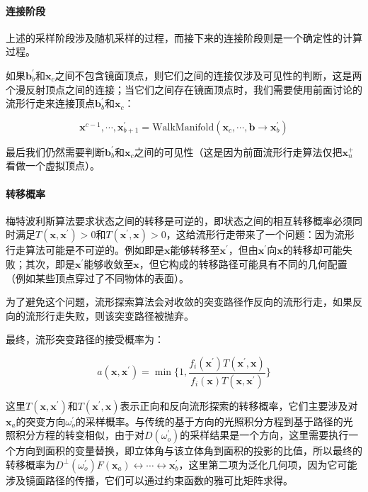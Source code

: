 \paragraph{连接阶段}
上述的采样阶段涉及随机采样的过程，而接下来的连接阶段则是一个确定性的计算过程。

如果$\mathbf{b}^{'}_b$和$\mathbf{x}_c$之间不包含镜面顶点，则它们之间的连接仅涉及可见性的判断，这是两个漫反射顶点之间的连接；当它们之间存在镜面顶点时，我们需要使用前面讨论的流形行走来连接顶点$\mathbf{b}^{'}_b$和$\mathbf{x}_c$：

\begin{equation}
	\mathbf{x}^{c-1},\cdots,\mathbf{x}^{'}_{b+1}=\text{WalkManifold}(\mathbf{x}_c,\cdots,\mathbf{b}\to\mathbf{x}^{'}_b)
\end{equation}

\noindent 最后我们仍然需要判断$\mathbf{b}^{'}_b$和$\mathbf{x}_c$之间的可见性（这是因为前面流形行走算法仅把$\mathbf{x}^{+}_n$看做一个虚拟顶点）。



\paragraph{转移概率}
梅特波利斯算法要求状态之间的转移是可逆的，即状态之间的相互转移概率必须同时满足$T(\mathbf{x},\mathbf{x}^{'})>0$和$T(\mathbf{x}^{'},\mathbf{x})>0$，这给流形行走带来了一个问题：因为流形行走算法可能是不可逆的。例如即是$\mathbf{x}$能够转移至$\mathbf{x}^{'}$，但由$\mathbf{x}^{'}$向$\mathbf{x}$的转移却可能失败；其次，即是$\mathbf{x}^{'}$能够收敛至$\mathbf{x}$，但它构成的转移路径可能具有不同的几何配置（例如某些顶点穿过了不同物体的表面）。

为了避免这个问题，流形探索算法会对收敛的突变路径作反向的流形行走，如果反向的流形行走失败，则该突变路径被抛弃。

最终，流形突变路径的接受概率为：

\begin{equation}
	a({\mathbf{x}},{\mathbf{x}}^{'})=\min\bigg\{1,\frac{f_i({\mathbf{x}}^{'})T({\mathbf{x}}^{'},{\mathbf{x}})}{f_i({\mathbf{x}})T({\mathbf{x}},{\mathbf{x}}^{'})}\bigg\}
\end{equation}

\noindent 这里$T(\mathbf{x},\mathbf{x}^{'})$和$T(\mathbf{x}^{'},\mathbf{x})$表示正向和反向流形探索的转移概率，它们主要涉及对$\mathbf{x}_a$的突变方向$\omega^{'}_o$的采样概率。与传统的基于方向的光照积分方程到基于路径的光照积分方程的转变相似，由于对$D(\omega^{'}_o)$的采样结果是一个方向，这里需要执行一个方向到面积的变量替换，即立体角与该立体角到面积的投影的比值，所以最终的转移概率为$D^{\perp}(\omega^{'}_o)F(\mathbf{x}_a)\leftrightarrow\cdots\leftrightarrow\mathbf{x}^{'}_b$，这里第二项为泛化几何项，因为它可能涉及镜面路径的传播，它们可以通过约束函数的雅可比矩阵求得。





